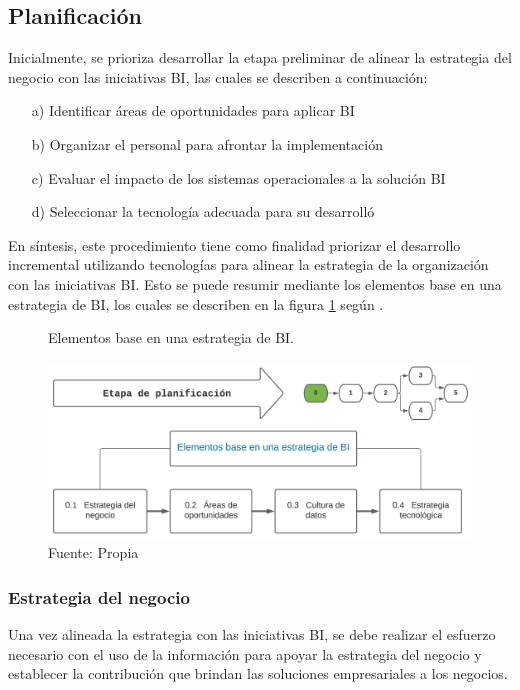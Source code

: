 \documentclass[12pt,jou]{apa7}
\begin{document}
\subsection{Planificación}
Inicialmente, se prioriza desarrollar la etapa preliminar de alinear la estrategia del negocio con las iniciativas BI, las cuales se describen a continuación:
\begin{itemize}
	\item[a)] Identificar áreas de oportunidades para aplicar BI
	\item[b)] Organizar el personal para afrontar la implementación
	\item[c)] Evaluar el impacto de los sistemas operacionales a la solución BI
	\item[d)] Seleccionar la tecnología adecuada para su desarrolló
\end{itemize}

En síntesis, este procedimiento tiene como finalidad priorizar el desarrollo incremental utilizando tecnologías para alinear la estrategia de la organización con las iniciativas BI. Esto se puede resumir mediante los elementos base en una estrategia de BI, los cuales se describen en la figura \ref{fig: ElementosBase} según \cite{LaPlata}.

\begin{figure}[h]
\caption{Elementos base en una estrategia de BI.}
\centering
\includegraphics[width=1\linewidth]{Figuras/etapa0}
\caption*{ Fuente: Propia} \label{fig: ElementosBase}	
\end{figure} 

\subsubsection{Estrategia del negocio} 
Una vez alineada la estrategia con las iniciativas BI, se debe realizar el esfuerzo necesario con el uso de la información para apoyar la estrategia del negocio y establecer la contribución que brindan las soluciones empresariales a los negocios.
\end{document}

